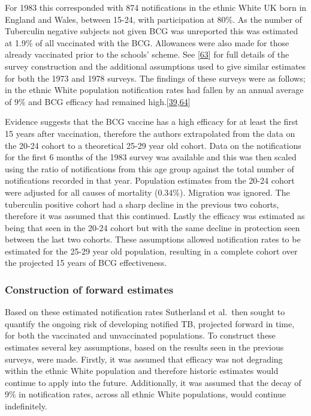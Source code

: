 \documentclass[11pt,twoside]{bristolthesis}
\begin{document}
  For 1983 this corresponded with 874 notifications in the ethnic White UK born in England and Wales, between 15-24, with participation at 80\%. As the number of Tuberculin negative subjects not given BCG was unreported this was estimated at 1.9\% of all vaccinated with the BCG. Allowances were also made for those already vaccinated prior to the schools' scheme. See {[}\protect\hyperlink{ref-Sutherland1987a}{63}{]} for full details of the survey construction and the additional assumptions used to give similar estimates for both the 1973 and 1978 surveys. The findings of these surveys were as follows; in the ethnic White population notification rates had fallen by an annual average of 9\% and BCG efficacy had remained high.{[}\protect\hyperlink{ref-Sutherland1989}{39},\protect\hyperlink{ref-Springett1988}{64}{]}
  
  Evidence suggests that the BCG vaccine has a high efficacy for at least the first 15 years after vaccination, therefore the authors extrapolated from the data on the 20-24 cohort to a theoretical 25-29 year old cohort. Data on the notifications for the first 6 months of the 1983 survey was available and this was then scaled using the ratio of notifications from this age group against the total number of notifications recorded in that year. Population estimates from the 20-24 cohort were adjusted for all causes of mortality (0.34\%). Migration was ignored. The tuberculin positive cohort had a sharp decline in the previous two cohorts, therefore it was assumed that this continued. Lastly the efficacy was estimated as being that seen in the 20-24 cohort but with the same decline in protection seen between the last two cohorts. These assumptions allowed notification rates to be estimated for the 25-29 year old population, resulting in a complete cohort over the projected 15 years of BCG effectiveness.
  
  \hypertarget{construction-of-forward-estimates}{%
  \subsubsection{Construction of forward estimates}\label{construction-of-forward-estimates}}
  
  Based on these estimated notification rates Sutherland et al.~then sought to quantify the ongoing risk of developing notified TB, projected forward in time, for both the vaccinated and unvaccinated populations. To construct these estimates several key assumptions, based on the results seen in the previous surveys, were made. Firstly, it was assumed that efficacy was not degrading within the ethnic White population and therefore historic estimates would continue to apply into the future. Additionally, it was assumed that the decay of 9\% in notification rates, across all ethnic White populations, would continue indefinitely.
  
\end{document}
